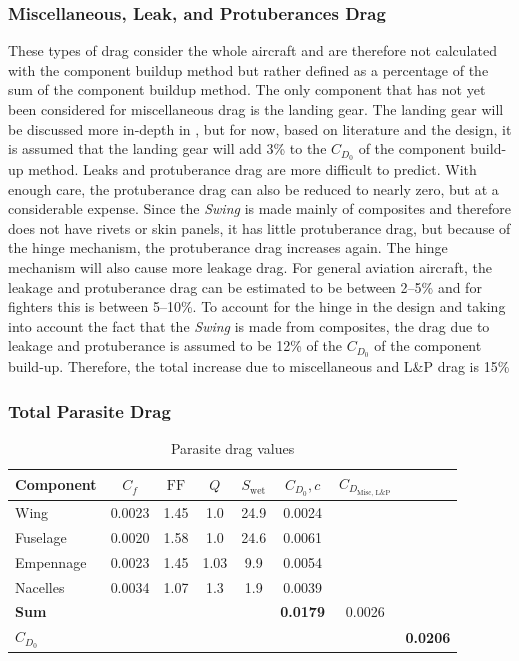\subsubsection{Miscellaneous, Leak, and Protuberances Drag}
These types of drag consider the whole aircraft and are therefore not calculated with the component buildup method but rather defined as a percentage of the sum of the component buildup method.
The only component that has not yet been considered for miscellaneous drag is the landing gear.
The landing gear will be discussed more in-depth in , but for now, based on literature and the design, it is assumed that the landing gear will add 3\% to the $C_{D_0}$ of the component build-up method.
Leaks and protuberance drag are more difficult to predict.
With enough care, the protuberance drag can also be reduced to nearly zero, but at a considerable expense.
Since the \textit{Swing} is made mainly of composites and therefore does not have rivets or skin panels, it has little protuberance drag, but because of the hinge mechanism, the protuberance drag increases again.
The hinge mechanism will also cause more leakage drag.
For general aviation aircraft, the leakage and protuberance drag can be estimated to be between 2–5\% and for fighters this is between 5–10\%.
To account for the hinge in the design and taking into account the fact that the \textit{Swing} is made from composites, the drag due to leakage and protuberance is assumed to be 12\% of the $C_{D_0}$ of the component build-up.
Therefore, the total increase due to miscellaneous and L\&P drag is 15\%
 
\subsubsection{Total Parasite Drag}
\begin{table}[H]
    \centering
    \caption{Parasite drag values}
    \label{tab:Parasite-Drag}
    \begin{tabular}{l|S|S|S|S|S|S|S} \toprule
        \textbf{Component}      & \textbf{$C_f$}  &  \textbf{$\mathrm{FF}$}  &  \textbf{$Q$}   & \textbf{$S_\text{wet}$}   &  \textbf{$C_{D_0},c$} & \textbf{$C_{D_\text{Misc, L\&P}}$} &\\ \midrule
        Wing           & 0.0023 &  1.45  &  1.0   &  24.9 &     0.0024          & &\\
        Fuselage       & 0.0020 &  1.58  &  1.0   &  24.6 &     0.0061          & &\\
        Empennage      & 0.0023 &  1.45  &  1.03  &  9.9  &     0.0054          & &\\
        Nacelles       & 0.0034 &  1.07  &  1.3   &  1.9  &     0.0039          & &\\ \midrule
        \textbf{Sum}   &       &         &        &       &     \textbf{0.0179} & 0.0026 &\\  \midrule
        \textbf{$C_{D_0}$}   &       &       &       &    &                     & &   \textbf{0.0206}              \\  \bottomrule
    \end{tabular}
\end{table}

